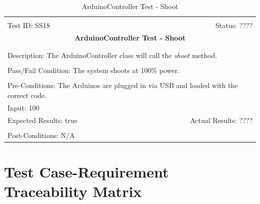 \documentclass[11pt]{article}
\begin{document}
\begin{center}
\begin{table}[H]
\begin{tabular}{|l r|}\hline&\\[-2mm]
	Test ID: SS18	&Status: ????\\[-3mm]
	\multicolumn{2}{|c|}{\textbf{\large{ArduinoController Test - Shoot}}}\\&\\\hline&\\[-3mm]
	\multicolumn{2}{|p{\textwidth}|}{Description: The ArduinoController class will call the \textit{shoot} method.}\\[1mm]\hline&\\[-3mm]
	\multicolumn{2}{|p{\textwidth}|}{Pass/Fail Condition: The system shoots at 100\% power.}\\[1mm]\hline&\\[-3mm]
	\multicolumn{2}{|p{\textwidth}|}{Pre-Conditions: The Arduinos are plugged in via USB and loaded with the correct code.}\\[4mm]
	\multicolumn{2}{|p{\textwidth}|}{Input: 100}\\[2mm]\hline
	\multicolumn{1}{|p{0.49\textwidth}}{Expected Results: true}	&\multicolumn{1}{|p{0.45\textwidth}|}{Actual Results: ????}\\\hline&\\[-3mm]
	\multicolumn{2}{|p{\textwidth}|}{Post-Conditions: N/A}\\\hline
\end{tabular}
\caption{ArduinoController Test - Shoot}
\end{table}
\end{center}

\section{Test Case-Requirement Traceability Matrix}
\end{document}
